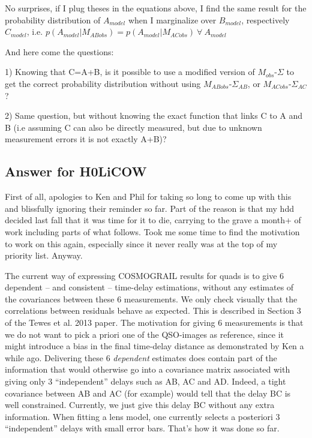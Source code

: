 \documentclass[11pt]{scrartcl}
\begin{document}
No surprises, if I plug theses in the equations above, I find the 
same result for the probability distribution of $A_{model}$ when I 
marginalize over $B_{model}$, respectively $C_{model}$, i.e. 
$p(A_{model}|M_{ABobs}) = 
p(A_{model}|M_{ACobs})  \ \forall \ A_{model} $ 

And here come the questions:

 1) Knowing that C=A+B, is it possible to use a modified version of 
$M_{obs}$-$\Sigma$ to get the correct probability distribution without 
using 
$M_{ABobs}$-$\Sigma_{AB}$, or $M_{ACobs}$-$\Sigma_{AC}$? 

 2) Same question, but without knowing the exact function that links 
C to A and B (i.e assuming C can also be directly measured, but due to 
unknown measurement errors it is not exactly A+B)?
 

\newpage
\subsection{Answer for H0LiCOW}

First of all, apologies to Ken and Phil for taking so long to come up 
with this and blissfully ignoring their reminder so far. Part of the 
reason is that my hdd decided last fall that it was time for it to die, 
carrying to the grave a month+ of work including parts of what follows. 
Took me some time to find the motivation to work on this again, 
especially since it never really was at the top of my priority list. 
Anyway.

The current way of expressing COSMOGRAIL results for quads is to give 6 
dependent -- and consistent -- time-delay estimations, without any 
estimates of the covariances between these 6 measurements. We 
only check visually that the correlations between residuals behave as 
expected. This is described in Section 3 of the Tewes et al. 2013 
paper. The motivation for giving 6 measurements is that we do not want 
to pick a priori one of the QSO-images as reference, since it might 
introduce a bias in the final time-delay distance as demonstrated by 
Ken a while ago. Delivering these 6 \emph{dependent} estimates does 
contain 
part of the information that would otherwise go into a covariance 
matrix associated with giving only 3 ``independent'' delays such as AB, 
AC and AD. Indeed, a tight covariance between AB and AC (for example) 
would tell that the delay BC is well constrained. Currently, we just 
give this delay BC without any extra information. When fitting a lens 
model, one currently selects a 
posteriori 3 ``independent'' delays with small error bars. That's how 
it was done so far.\\
\end{document}
